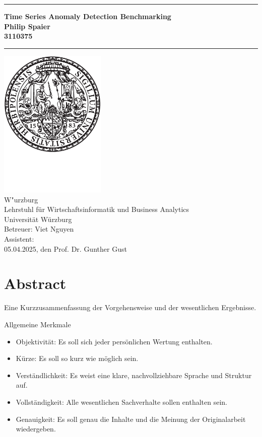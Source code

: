 \documentclass[12pt,oneside]{article}
\newcommand{\JMUTitle}[9]{

  \thispagestyle{empty}
  \vspace*{\stretch{1}}
  {\parindent0cm
  \rule{\linewidth}{.7ex}
  }
  \begin{flushright}
    \sffamily\bfseries\Huge
    #1\\
    \vspace*{\stretch{1}}
    \sffamily\bfseries\large
    #2\\
    \vspace*{\stretch{1}}
    \sffamily\bfseries\small
    #3
  \end{flushright}
  \rule{\linewidth}{.7ex}

  \vspace*{\stretch{1}}
  \begin{center}
    \includegraphics[width=2in]{siegel} \\
    \vspace*{\stretch{1}}
    \Large #5 \\

    \vspace*{\stretch{2}}
   \large Lehrstuhl f\"{u}r Wirtschaftsinformatik und Business Analytics\\
    \large Universität Würzburg\\
    \vspace*{\stretch{1}}
    \large Betreuer:  #8 \\[1mm]
    \large Assistent:  #9 \\[1mm]
    \vspace*{\stretch{1}}
    \large #6, den #7
  \end{center}
}
\begin{document}
  \JMUTitle
      {Time Series Anomaly Detection Benchmarking}        %
      {Philip Spaier}                        %
      {3110375}
      
      {Seminararbeit } %
      {W"urzburg}                           %
      {05.04.2025}                          %
      {Prof. Dr. Gunther Gust}           %
      {Viet Nguyen} %
      
  \clearpage

\lhead{}
    \setcounter{page}{1}

\tableofcontents
\clearpage

\listoffigures

\listoftables
\clearpage

\setlength{\parskip}{0.5em} 


\section*{Abstract}

Eine Kurzzusammenfassung der Vorgehensweise und der wesentlichen Ergebnisse.

Allgemeine Merkmale
\begin{itemize}
    \item Objektivität: Es soll sich jeder persönlichen Wertung enthalten.
    \item Kürze: Es soll so kurz wie möglich sein.
    \item Verständlichkeit: Es weist eine klare, nachvollziehbare Sprache und Struktur auf.
    \item Vollständigkeit: Alle wesentlichen Sachverhalte sollen enthalten sein.
    \item Genauigkeit: Es soll genau die Inhalte und die Meinung der Originalarbeit wiedergeben.
\end{itemize}{}


\clearpage
{}  
    \setcounter{page}{1}
\lhead{\nouppercase{\leftmark}}

\end{document}

